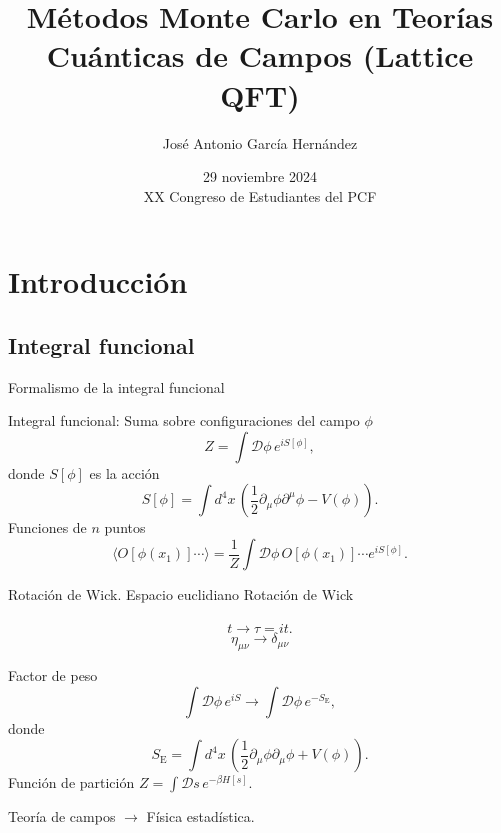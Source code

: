 \documentclass[11pt]{beamer}
\author{José Antonio García Hernández}
\title{Métodos Monte Carlo en Teorías Cuánticas de Campos (Lattice QFT)}
\institute{Instituto de Ciencias Nucleares, UNAM}
\date{29 noviembre 2024 \\ XX Congreso de Estudiantes del PCF}
\begin{document}
\begin{frame}
\titlepage
\end{frame}

\begin{frame}
\tableofcontents
\end{frame}

\section{Introducción}
\subsection{Integral funcional}
\begin{frame}{Formalismo de la integral funcional}

    Integral funcional: Suma sobre configuraciones del campo $\phi$
    $$Z = \int \mathcal{D}\phi \, e^{iS[\phi]},$$
    donde $S[\phi]$ es la acción%
    $$ S[\phi] = \int d^4 x \, \left( \frac{1}{2}\partial_{\mu}\phi \partial^{\mu}\phi - V(\phi)\right).$$
    Funciones de $n$ puntos
    $$ \langle O[\phi(x_1)] \cdots \rangle =  \frac{1}{Z}\int \mathcal{D}\phi \, O[\phi(x_1)]\cdots e^{iS[\phi]}.$$
\end{frame}

\begin{frame}{Rotación de Wick. Espacio euclidiano}
    Rotación de Wick \\~
    $$ t \to \tau = i t.$$
    $$ \eta_{\mu\nu} \to \delta_{\mu\nu}$$
        
    Factor de peso 
        $$ \int \mathcal{D}\phi \, e^{iS} \to  \int \mathcal{D}\phi \, e^{-S_{\text{E}}},$$
        donde 
        $$ S_{\text{E}} = \int d^4 x \, \left( \frac{1}{2}\partial_{\mu}\phi \partial_{\mu}\phi + V(\phi)\right).$$
        Función de partición $ Z = \int \mathcal{D}s\, e^{-\beta H[s]}$.
        
        Teoría de campos $\to$ Física estadística. 
\end{frame}
\end{document}
